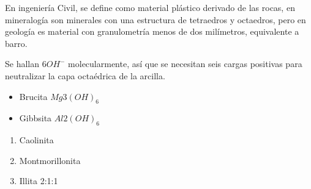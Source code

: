 \begin{definition}[Arcilla]
    En ingeniería Civil, se define como material plástico derivado de las rocas, en mineralogía son minerales con una estructura de tetraedros y octaedros, pero en geología es material con granulometría menos de dos milímetros, equivalente a barro.
\end{definition}

Se hallan $6OH^-$ molecularmente, así que se necesitan seis cargas positivas para neutralizar la capa octaédrica de la arcilla.

\begin{itemize}
    \item Brucita $Mg3(OH)_6$
    \item Gibbsita $Al2(OH)_6$
\end{itemize}

\begin{enumerate}
    \item Caolinita
    \item Montmorillonita
    \item Illita 2:1:1
\end{enumerate}

